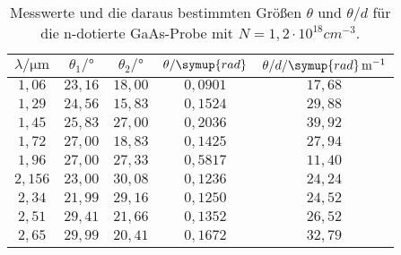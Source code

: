 \begin{table}
  \centering
  \caption{Messwerte und die daraus bestimmten Größen $\theta$ und $\theta/d$ für die n-dotierte GaAs-Probe
  mit $N=1,2 \cdot 10^{18} \si{cm}^{-3}$.}
  \label{tab:m2}
  \begin{tabular}{c c c c c}
    \toprule
    $\lambda/\si{\micro\meter}$ & $\theta_{1}/\si{\degree}$ & $\theta_{2}/\si{\degree}$ & $\theta/\symup{rad}$ & $\theta/d/\symup{rad}\, \si{m}^{-1}$\\
    \midrule
    $1,06 $ & $23,16$ & $18,00$ & $0,0901$ & $17,68$ \\
    $1,29 $ & $24,56$ & $15,83$ & $0,1524$ & $29,88$ \\
    $1,45 $ & $25,83$ & $27,00$ & $0,2036$ & $39,92$ \\
    $1,72 $ & $27,00$ & $18,83$ & $0,1425$ & $27,94$ \\
    $1,96 $ & $27,00$ & $27,33$ & $0,5817$ & $11,40$ \\
    $2,156$ & $23,00$ & $30,08$ & $0,1236$ & $24,24$ \\
    $2,34 $ & $21,99$ & $29,16$ & $0,1250$ & $24,52$ \\
    $2,51 $ & $29,41$ & $21,66$ & $0,1352$ & $26,52$ \\
    $2,65 $ & $29,99$ & $20,41$ & $0,1672$ & $32,79$ \\
    \bottomrule
  \end{tabular}
\end{table}

